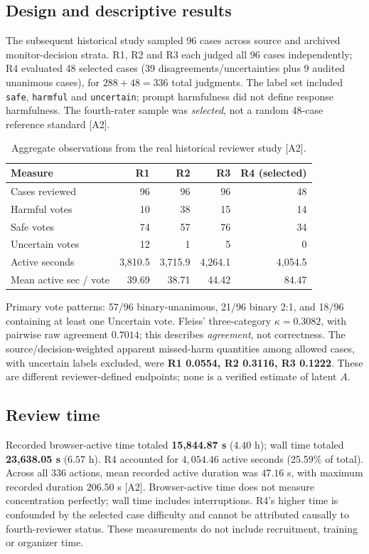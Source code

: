 \documentclass[11pt,a4paper]{article}
\begin{document}
\subsection{Design and descriptive results}
The subsequent historical study sampled 96 cases across source and archived monitor-decision strata. R1, R2 and R3 each judged all 96 cases independently; R4 evaluated 48 selected cases (39 disagreements/uncertainties plus 9 audited unanimous cases), for $288+48=336$ total judgments. The label set included \texttt{safe}, \texttt{harmful} and \texttt{uncertain}; prompt harmfulness did not define response harmfulness. The fourth-rater sample was \emph{selected}, not a random 48-case reference standard [A2].
\begin{table}[H]\centering\small
\caption{Aggregate observations from the real historical reviewer study [A2].}
\begin{tabular}{@{}lrrrr@{}}\toprule
Measure & R1 & R2 & R3 & R4 (selected)\\\midrule
Cases reviewed & 96 & 96 & 96 & 48\\
Harmful votes & 10 & 38 & 15 & 14\\
Safe votes & 74 & 57 & 76 & 34\\
Uncertain votes & 12 & 1 & 5 & 0\\
Active seconds & 3,810.5 & 3,715.9 & 4,264.1 & 4,054.5\\
Mean active sec / vote & 39.69 & 38.71 & 44.42 & 84.47\\\bottomrule
\end{tabular}
\end{table}
Primary vote patterns: 57/96 binary-unanimous, 21/96 binary 2:1, and 18/96 containing at least one Uncertain vote. Fleiss' three-category $\kappa=0.3082$, with pairwise raw agreement $0.7014$; this describes \emph{agreement}, not correctness. The source/decision-weighted apparent missed-harm quantities among allowed cases, with uncertain labels excluded, were \textbf{R1 0.0554, R2 0.3116, R3 0.1222}. These are different reviewer-defined endpoints; none is a verified estimate of latent $A$.

\subsection{Review time}
Recorded browser-active time totaled \textbf{15,844.87 s} ($4.40$ h); wall time totaled \textbf{23,638.05 s} ($6.57$ h). R4 accounted for $4{,}054.46$ active seconds (25.59\% of total). Across all 336 actions, mean recorded active duration was $47.16$ s, with maximum recorded duration $206.50$ s [A2]. Browser-active time does not measure concentration perfectly; wall time includes interruptions. R4's higher time is confounded by the selected case difficulty and cannot be attributed causally to fourth-reviewer status. These measurements do not include recruitment, training or organizer time.
\end{document}
